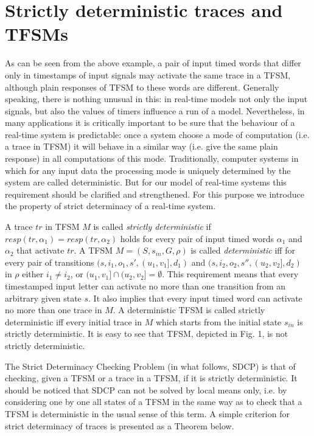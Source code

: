\documentclass[conference]{IEEEtran}
\begin{document}
\section{Strictly deterministic traces and TFSMs}

As can be seen from the above example, a pair of input timed words that differ only in timestamps of input signals may activate the same trace in a TFSM, although plain responses of TFSM to these words are different. Generally speaking, there is nothing unusual in this: in real-time models not only the input signals, but also the values of timers influence a run of a model. Nevertheless, in many applications it is critically important to be sure that the behaviour of a real-time system is predictable: once a system choose a mode of computation (i.e. a trace in TFSM) it will behave in a similar way (i.e. give the same plain response) in all computations of this mode. Traditionally, computer systems in which for any input data the processing mode is uniquely determined by the system are called deterministic. But for our model of real-time systems this requirement should be clarified and strengthened. For this purpose we introduce the property of strict determinacy of a real-time system. 

A trace $tr$ in TFSM $M$ is called \emph{strictly deterministic} if $resp(tr,\alpha_1)=resp(tr,\alpha_2)$ holds for every pair of input timed words $\alpha_1$ and $\alpha_2$ that activate $tr$. A TFSM $M=( S, s_{in}, G, \rho)$ is called \emph{deterministic} iff for every pair of transitions $(s,i_1,o_1,s',(u_1,v_1], d_1)$ and $(s,i_2,o_2,s'',(u_2,v_2], d_2)$ in $\rho$ either $i_1\ne i_2$, or $(u_1,v_1] \cap (u_2,v_2]=\emptyset$. This requirement means that every timestamped input letter can activate no more than one transition from an arbitrary given state $s$. It also implies that every input timed word can activate no more than one trace in $M$. A deterministic TFSM is called strictly deterministic iff every initial trace in $M$ which starts from the initial state $s_{in}$ is strictly deterministic. It is easy to see that TFSM, depicted in Fig. 1, is not strictly deterministic. 

The Strict Determinacy Checking Problem (in what follows, SDCP) is that of checking, given a TFSM or a trace in a TFSM, if it is strictly deterministic. It should be noticed that SDCP can not be solved by local means only, i.e. by considering one by one all states of a TFSM in the same way as to check that a TFSM is deterministic in the usual sense of this term. A simple criterion for strict determinacy of traces is presented as a Theorem below.
\end{document}
